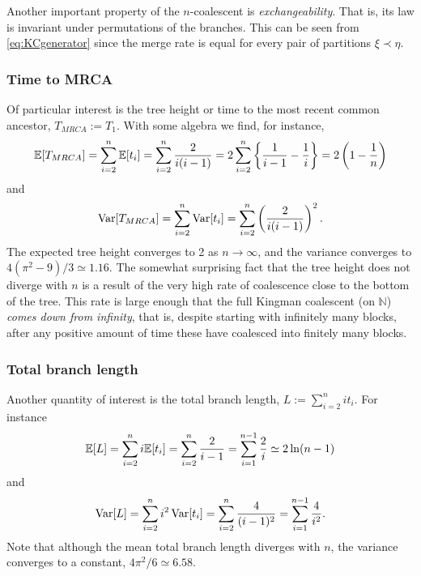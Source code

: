 Another important property of the $n$-coalescent is \emph{exchangeability}. That is, its law is invariant under permutations of the branches. This can be seen from \eqref{eq:KCgenerator} since the merge rate is equal for every pair of partitions $\xi \prec \eta$.

\subsubsection{Time to MRCA}
Of particular interest is the tree height or time to the most recent common ancestor, $T_{MRCA} := T_1$.
With some algebra we find, for instance,
\begin{equation*}
\mathbb{E}[ T_{MRCA} ] 
= \sum_{i=2}^{n} \mathbb{E}[t_i]
= \sum_{i=2}^n \frac{2}{i(i-1)}
= 2 \sum_{i=2}^n \left\{ \frac{1}{i-1} - \frac{1}{i} \right\}
= 2 \left( 1 - \frac{1}{n} \right)
\end{equation*}
and
\begin{equation*}
\operatorname{Var}[ T_{MRCA} ] 
= \sum_{i=2}^n \operatorname{Var}[t_i]
= \sum_{i=2}^n \left( \frac{2}{i(i-1)} \right)^2 .
\end{equation*}
The expected tree height converges to 2 as $n\to\infty$, and the variance converges to $4(\pi^2 - 9)/3 \simeq 1.16$.
The somewhat surprising fact that the tree height does not diverge with $n$ is a result of the very high rate of coalescence close to the bottom of the tree. This rate is large enough that the full Kingman coalescent (on $\mathbb{N}$) \emph{comes down from infinity}, that is, despite starting with infinitely many blocks, after any positive amount of time these have coalesced into finitely many blocks.


\subsubsection{Total branch length}
Another quantity of interest is the total branch length,
$ L := \sum_{i=2}^n i t_i $.
For instance
\begin{equation*}
\E[ L ] 
= \sum_{i=2}^n i \E[ t_i ]
= \sum_{i=2}^n \frac{2}{i-1}
= \sum_{i=1}^{n-1} \frac{2}{i} %
\simeq 2 \ln(n-1) 
\end{equation*}
and
\begin{equation*}
\operatorname{Var}[ L ] 
= \sum_{i=2}^n i^2 \operatorname{Var}[ t_i ]
= \sum_{i=2}^n \frac{4}{(i-1)^2}
= \sum_{i=1}^{n-1} \frac{4}{i^2} .
\end{equation*}
Note that although the mean total branch length diverges with $n$, the variance converges to a constant, $4\pi^2 /6 \simeq 6.58$.


